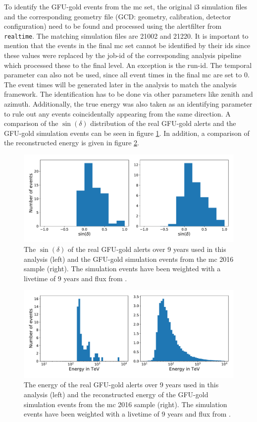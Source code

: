 To identify the GFU-gold events from the mc set, the original i3 simulation files and the corresponding geometry file (GCD: geometry, calibration, detector configuration) need to be found and processed using the alertfilter from \texttt{realtime}.
The matching simulation files are 21002 and 21220.
It is important to mention that the events in the final mc set cannot be identified by their ids since these values were replaced by the job-id of the corresponding analysis pipeline which processed these to the final level.
An exception is the run-id.
The temporal parameter can also not be used, since all event times in the final mc are set to \num{0}.
The event times will be generated later in the analysis to match the analysis framework.
The identification has to be done via other parameters like zenith and azimuth.
Additionally, the true energy was also taken as an identifying parameter to rule out any events coincidentally appearing from the same direction.
A comparison of the $\sin{(\delta)}$ distribution of the real GFU-gold alerts and the GFU-gold simulation events can be seen in figure \ref{fig:gfu_gold_comp}.
In addition, a comparison of the reconstructed energy is given in figure \ref{fig:gfu_gold_comp_energy}.
\begin{figure}
    \centering
    \includegraphics[width=12cm]{Plots/03_data/gfu_gold_comp.pdf}
    \caption{The $\sin{(\delta)}$ of the real GFU-gold alerts over 9 years used in this analysis (left) and the GFU-gold simulation events from the mc 2016 sample (right). The simulation events have been weighted with a livetime of 9 years and flux from \cite{flux}.}
    \label{fig:gfu_gold_comp}
\end{figure}
\begin{figure}
    \centering
    \includegraphics[width=12cm]{Plots/03_data/gfu_gold_energy_comp.pdf}
    \caption{The energy of the real GFU-gold alerts over 9 years used in this analysis (left) and the reconstructed energy of the GFU-gold simulation events from the mc 2016 sample (right). The simulation events have been weighted with a livetime of 9 years and flux from \cite{flux}.}
    \label{fig:gfu_gold_comp_energy}
\end{figure}


